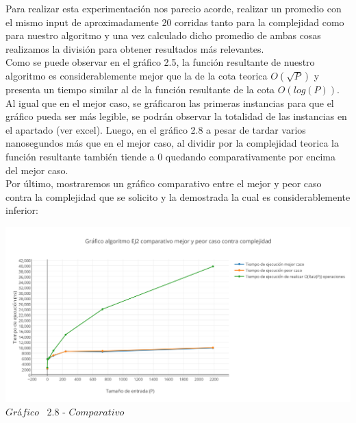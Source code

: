 Para realizar esta experimentaci\'on nos parecio acorde, realizar un promedio con el mismo input de aproximadamente 20 corridas
tanto para la complejidad como para nuestro algoritmo y una vez calculado dicho promedio de ambas cosas realizamos la divisi\'on para
obtener resultados m\'as relevantes.\\ 

Como se puede observar en el gr\'afico 2.5, la funci\'on resultante de nuestro algoritmo es considerablemente mejor que la de la cota teorica $O(\sqrt{P})$ y presenta un tiempo similar al de la funci\'on resultante de la cota $O(log(P))$. Al igual que en el mejor caso, se gr\'aficaron las primeras instancias para que el gr\'afico pueda ser m\'as legible, se podr\'an observar la totalidad de las instancias en el apartado (ver excel).
Luego, en el gr\'afico 2.8 a pesar de tardar varios nanosegundos m\'as que en el mejor caso, al dividir por la complejidad teorica
la función resultante tambi\'en tiende a 0 quedando comparativamente por encima del mejor caso.\\

Por \'ultimo, mostraremos un gr\'afico comparativo entre el mejor y peor caso contra la complejidad que se solicito y la demostrada la cual es considerablemente inferior:\\

\vspace*{0.3cm} \vspace*{0.3cm}
  \begin{center}
 \includegraphics[scale=0.65]{./EJ2/comparativo1.png}
 {$Gr$\'a$fico$ \ 2.8 - $Comparativo$}
  \end{center}
  \vspace*{0.3cm}
  
